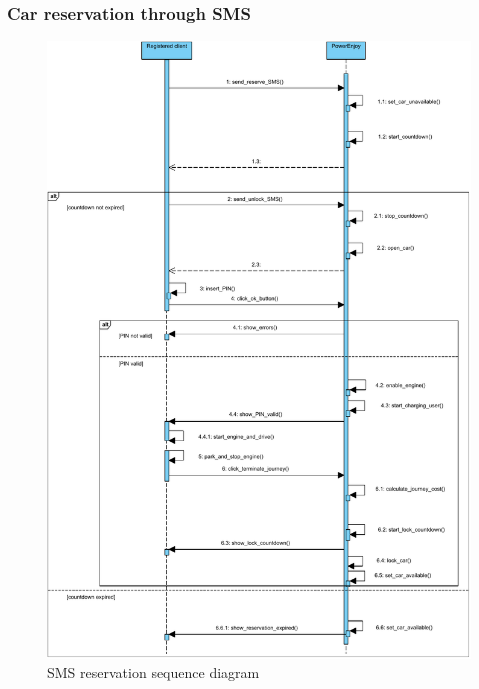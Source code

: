 \subsubsection{Car reservation through SMS}
\begin{figure}[H]
\centering
\includegraphics[width=\textwidth, keepaspectratio]{../images/diagram/sequence/sms_reservation.pdf}
\caption{SMS reservation sequence diagram}
\end{figure}



